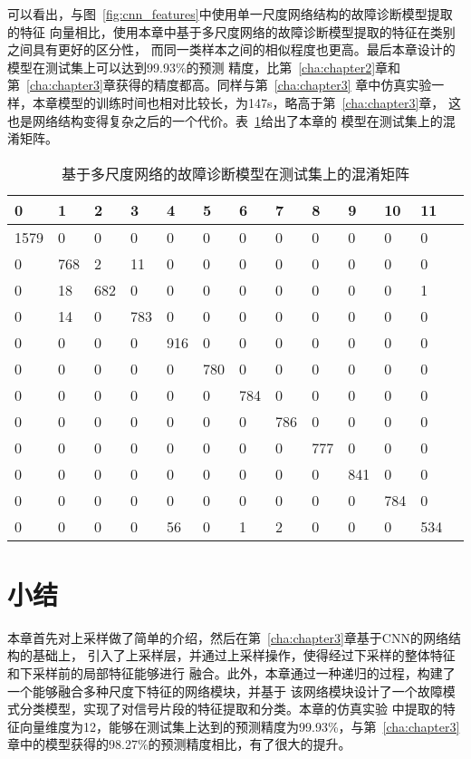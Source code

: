 可以看出，与图~\ref{fig:cnn_features}中使用单一尺度网络结构的故障诊断模型提取的特征
向量相比，使用本章中基于多尺度网络的故障诊断模型提取的特征在类别之间具有更好的区分性，
而同一类样本之间的相似程度也更高。最后本章设计的模型在测试集上可以达到99.93\%的预测
精度，比第~\ref{cha:chapter2}章和第~\ref{cha:chapter3}章获得的精度都高。同样与第~\ref{cha:chapter3}
章中仿真实验一样，本章模型的训练时间也相对比较长，为147s，略高于第~\ref{cha:chapter3}章，
这也是网络结构变得复杂之后的一个代价。表~\ref{tab:chap4:confusion_matrix}给出了本章的
模型在测试集上的混淆矩阵。
\begin{table}[htb]
  \centering
  \begin{minipage}[t]{0.9\linewidth} %
  \caption{基于多尺度网络的故障诊断模型在测试集上的混淆矩阵}
  \label{tab:chap4:confusion_matrix}
    \begin{tabularx}{\linewidth}{l|XXXXXXXXXXXX}
      \toprule[1.5pt]
         0 &   1 &   2 &   3 &   4 &   5 &   6 &   7 &   8 &   9 &  10 &  11 \\\midrule[1pt]
      1579 &   0 &   0 &   0 &   0 &   0 &   0 &   0 &   0 &   0 &   0 &   0 \\
         0 & 768 &   2 &  11 &   0 &   0 &   0 &   0 &   0 &   0 &   0 &   0 \\
         0 &  18 & 682 &   0 &   0 &   0 &   0 &   0 &   0 &   0 &   0 &   1 \\
         0 &  14 &   0 & 783 &   0 &   0 &   0 &   0 &   0 &   0 &   0 &   0 \\
         0 &   0 &   0 &   0 & 916 &   0 &   0 &   0 &   0 &   0 &   0 &   0 \\
         0 &   0 &   0 &   0 &   0 & 780 &   0 &   0 &   0 &   0 &   0 &   0 \\
         0 &   0 &   0 &   0 &   0 &   0 & 784 &   0 &   0 &   0 &   0 &   0 \\
         0 &   0 &   0 &   0 &   0 &   0 &   0 & 786 &   0 &   0 &   0 &   0 \\
         0 &   0 &   0 &   0 &   0 &   0 &   0 &   0 & 777 &   0 &   0 &   0 \\
         0 &   0 &   0 &   0 &   0 &   0 &   0 &   0 &   0 & 841 &   0 &   0 \\
         0 &   0 &   0 &   0 &   0 &   0 &   0 &   0 &   0 &   0 & 784 &   0 \\
         0 &   0 &   0 &   0 &  56 &   0 &   1 &   2 &   0 &   0 &   0 & 534 \\
      \bottomrule[1.5pt]
    \end{tabularx}
  \end{minipage}
\end{table}

\section{小结}

本章首先对上采样做了简单的介绍，然后在第~\ref{cha:chapter3}章基于CNN的网络结构的基础上，
引入了上采样层，并通过上采样操作，使得经过下采样的整体特征和下采样前的局部特征能够进行
融合。此外，本章通过一种递归的过程，构建了一个能够融合多种尺度下特征的网络模块，并基于
该网络模块设计了一个故障模式分类模型，实现了对信号片段的特征提取和分类。本章的仿真实验
中提取的特征向量维度为12，能够在测试集上达到的预测精度为99.93\%，与第~\ref{cha:chapter3}
章中的模型获得的98.27\%的预测精度相比，有了很大的提升。
